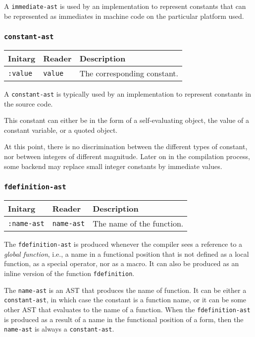 A \texttt{immediate-ast} is used by an implementation to represent
constants that can be represented as immediates in machine code on the
particular platform used.

\subsubsection{\texttt{constant-ast}}
\label{constant-ast}

\begin{tabular}{|l|l|l|}
\hline
Initarg & Reader & Description\\
\hline\hline
\texttt{:value} & \texttt{value} & The corresponding constant.\\
\hline
\end{tabular}

A \texttt{constant-ast} is typically used by an implementation to
represent constants in the source code.

This constant can either be in the form of a self-evaluating object,
the value of a constant variable, or a quoted object.

At this point, there is no discrimination between the different types
of constant, nor between integers of different magnitude.  Later on
in the compilation process, some backend may replace small integer
constants by immediate values. 

\subsubsection{\texttt{fdefinition-ast}}
\label{fdefinition-ast}

\begin{tabular}{|l|l|l|}
\hline
Initarg & Reader & Description\\
\hline\hline
\texttt{:name-ast} & \texttt{name-ast} & The name of the function.\\  
\hline
\end{tabular}

The \texttt{fdefinition-ast} is produced whenever the compiler sees a
reference to a \emph{global function}, i.e., a name in a functional
position that is not defined as a local function, as a special
operator, nor as a macro.  It can also be produced as an inline
version of the function \texttt{fdefinition}.

The \texttt{name-ast} is an AST that produces the name of function.
It can be either a \texttt{constant-ast}, in which case the constant
is a function name, or it can be some other AST that evaluates to the
name of a function.  When the \texttt{fdefinition-ast} is produced as
a result of a name in the functional position of a form, then the
\texttt{name-ast} is always a \texttt{constant-ast}.

